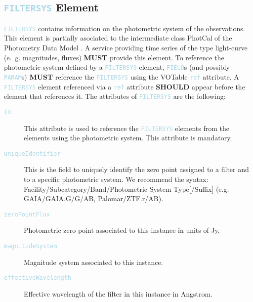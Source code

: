 \documentclass[11pt,a4paper]{ivoa}
\newcommand\elem[1]{\textcolor{LightBlue}{{\tt#1}}}
\begin{document}
\subsection{\elem{FILTERSYS} Element}
\elem{FILTERSYS} contains information on the photometric system of the observations. This element is partially asociated to the intermediate class PhotCal of the Photometry Data Model \cite{PhotometryDM}. A service providing time series of the type light-curve (e.~g. magnitudes, fluxes) \textbf{MUST} provide this element. To reference the photometric system defined by a \elem{FILTERSYS} element, \elem{FIELD}s (and possibly \elem{PARAM}s) \textbf{MUST} reference the \elem{FILTERSYS} using the VOTable \elem{ref} attribute. A \elem{FILTERSYS} element referenced via a \elem{ref} attribute \textbf{SHOULD} appear before the element that references it. The attributes of \elem{FILTERSYS} are the following: 
\begin{description}
     \item[\elem{ID}] This attribute is used to reference the \elem{FILTERSYS} elements from the elements using the photometric system. This attribute is mandatory. 
     \item[\elem{uniqueIdentifier}] This is the field to uniquely identify the zero point assigned to a filter and to a specific photometric system. We recommend the syntax: Facility/Subcategory/Band/Photometric System Type[/Suffix] (e.g. GAIA/GAIA.G/G/AB, Palomar/ZTF.r/AB). 
     \item[\elem{zeroPointFlux}] Photometric zero point associated to this instance in units of Jy. 
     \item[\elem{magnitudeSystem}] Magnitude system associated to this instance.
     \item[\elem{effectiveWavelength}] Effective wavelength of the filter in this instance in Angstrom. 
\end{description}
\end{document}
